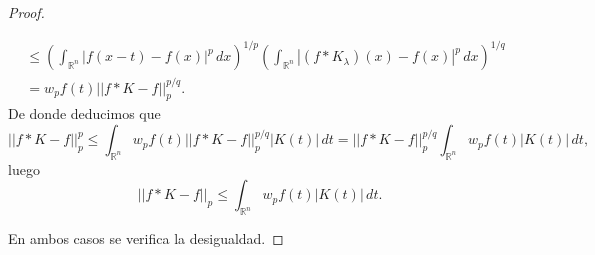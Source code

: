 \begin{proof}
\begin{itemize}
\begin{align}
    &\leq \left( \int_{\mathbb{R}^n} \left|f(x-t)-f(x) \right|^p \, dx  \right)^{1/p} \left( \int_{\mathbb{R}^n} |(f*K_{\lambda})(x)-f(x)|^{p} \, dx  \right)^{1/q}  \\
    &= w_pf(t)||f*K-f||_p^{p/q}.
\end{align}
\noindent De donde deducimos que 
\begin{equation}
       ||f*K-f||_p^p \leq \int_{\mathbb{R}^n} w_pf(t)||f*K-f||_p^{p/q} |K(t)|\, dt = ||f*K-f||_p^{p/q}\int_{\mathbb{R}^n} w_pf(t) |K(t)|\, dt,
\end{equation}
\noindent luego 
\begin{equation}
       ||f*K-f||_p \leq \int_{\mathbb{R}^n} w_pf(t) |K(t)|\, dt.
\end{equation}
\end{itemize}
En ambos casos se verifica la desigualdad. 
\end{proof}







